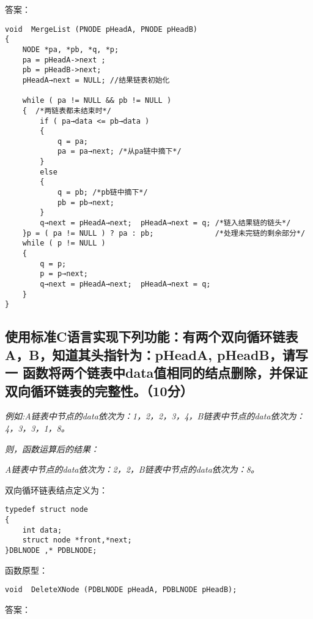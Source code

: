 ﻿\documentclass  [11pt,onecolumn,a4paper]{article}
\begin{document}
答案：
\begin{lstlisting}
void  MergeList (PNODE pHeadA, PNODE pHeadB)
{
    NODE *pa, *pb, *q, *p;
    pa = pHeadA->next ;
    pb = pHeadB->next;
    pHeadA→next = NULL;	//结果链表初始化

    while ( pa != NULL && pb != NULL ) 
    {  /*两链表都未结束时*/	
        if ( pa→data <= pb→data )
        {
            q = pa; 
            pa = pa→next; /*从pa链中摘下*/
        }			
        else
        { 
            q = pb; /*pb链中摘下*/
            pb = pb→next; 
        }			
        q→next = pHeadA→next;  pHeadA→next = q; /*链入结果链的链头*/
    }p = ( pa != NULL ) ? pa : pb;				/*处理未完链的剩余部分*/
    while ( p != NULL )
    {			
        q = p; 
        p = p→next; 
        q→next = pHeadA→next;  pHeadA→next = q;
    }
}
\end{lstlisting}

\pagebreak
\begin{minipage}{0.9\textwidth}
\vspace{40ex}
\subsection{使用标准C语言实现下列功能：有两个双向循环链表A，B，知道其头指针为：pHeadA, pHeadB，请写一
  函数将两个链表中data值相同的结点删除，并保证双向循环链表的完整性。（10分）}

\begin{minipage}{0.9\textwidth}
\vspace{1ex}
\small{\textit{例如:A链表中节点的data依次为：1，2，2，3，4，B链表中节点的data依次为：4，3，3，1，8。}}

\small{\textit{则，函数运算后的结果：}}

\small{\textit{A链表中节点的data依次为：2，2，B链表中节点的data依次为：8。}}
\vspace{2ex}
\end{minipage}

双向循环链表结点定义为：
\begin{lstlisting}
typedef struct node
{
    int data;
    struct node *front,*next;
}DBLNODE ,* PDBLNODE;
\end{lstlisting}
函数原型：
\begin{lstlisting}
void  DeleteXNode (PDBLNODE pHeadA, PDBLNODE pHeadB); 
\end{lstlisting}
\end{minipage}

答案：
\end{document}

